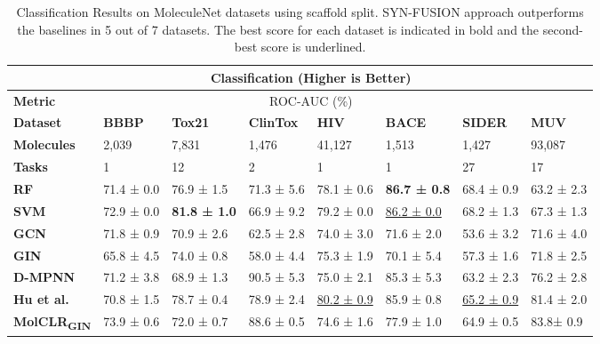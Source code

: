 \documentclass[sigconf,nonacm]{acmart}
\begin{document}
\begin{table*}[!t]
    \caption{Classification Results on MoleculeNet datasets using scaffold split. SYN-FUSION approach outperforms the baselines in 5 out of 7 datasets. The best score for each dataset is indicated in bold and the second-best score is underlined.}
    \centering
    

    \begin{tabular}[width=0.8\linewidth]{llllllll}
    
    \hline
        & \multicolumn{6}{c}{\textbf{Classification (Higher is Better)}} \\ \hline
        \textbf{Metric} & \multicolumn{6}{c}{ROC-AUC (\%)}  \\ \hline
        \textbf{Dataset} & \textbf{BBBP} & \textbf{Tox21} & \textbf{ClinTox} & \textbf{HIV} & \textbf{BACE} & \textbf{SIDER} & \textbf{MUV} \\ 
        \textbf{Molecules} & 2,039 & 7,831 & 1,476 & 41,127 & 1,513 & 1,427 & 93,087 \\ 
        \textbf{Tasks} & 1 & 12 & 2 & 1 & 1 & 27 & 17 \\ \hline
        \textbf{RF} & 71.4 ± 0.0 & 76.9 ± 1.5 & 71.3 ± 5.6 & 78.1 ± 0.6 & \textbf{86.7 ± 0.8} & 68.4 ± 0.9 & 63.2 ± 2.3 \\
        \textbf{SVM} & 72.9 ± 0.0 & \textbf{81.8 ± 1.0} & 66.9 ± 9.2 & 79.2 ± 0.0 & \underline{86.2 ± 0.0} & 68.2 ± 1.3 & 67.3 ± 1.3 \\ 
        \textbf{GCN} \cite{DBLP:conf/iclr/KipfW17} & 71.8 ± 0.9 & 70.9 ± 2.6 & 62.5 ± 2.8 & 74.0 ± 3.0 & 71.6 ± 2.0 & 53.6 ± 3.2 & 71.6 ± 4.0 \\ 
        \textbf{GIN} \cite{DBLP:conf/iclr/XuHLJ19} & 65.8 ± 4.5 & 74.0 ± 0.8 & 58.0 ± 4.4 & 75.3 ± 1.9 & 70.1 ± 5.4 & 57.3 ± 1.6 & 71.8 ± 2.5 \\ 
\textbf{D-MPNN} \cite{doi:10.1021/acs.jcim.9b00237} & 71.2 ± 3.8 & 68.9 ± 1.3 & 90.5 ± 5.3 & 75.0 ± 2.1 & 85.3 ± 5.3 & 63.2 ± 2.3 & 76.2 ± 2.8 \\ 
        \textbf{Hu et al.} \cite{DBLP:conf/iclr/HuLGZLPL20} & 70.8 ± 1.5 & 78.7 ± 0.4 & 78.9 ± 2.4 & \underline{80.2 ± 0.9} & 85.9 ± 0.8 & \underline{65.2 ± 0.9} & 81.4 ± 2.0 \\ 
 




        
\textbf{MolCLR}\textsubscript{\textbf{GIN}}\cite{Wang_2022} & 73.9 ± 0.6  & 72.0 ± 0.7  & 88.6 ± 0.5 & 74.6 ± 1.6 & 77.9 ± 1.0 & 64.9 ± 0.5 & 83.8± 0.9  \\


\end{tabular}
\end{table*}
\end{document}
